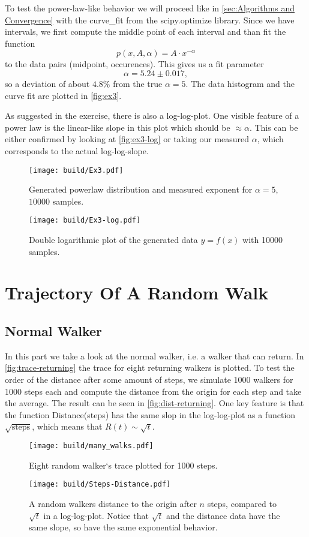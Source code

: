 \documentclass{article}
\begin{document}
To test the power-law-like behavior we will proceed like in \autoref{sec:Algorithms and Convergence} with 
the curve\_fit from the scipy.optimize library. Since we have intervals, we first compute the middle point
of each interval and than fit the function
\[
  p(x, A, \alpha) = A \cdot x^{-\alpha}
\]
to the data pairs (midpoint, occurences). This gives us a fit parameter 
\[
  \alpha = 5.24 \pm 0.017,
\]
so a deviation of about $4.8\%$ from the true $\alpha = 5$. The data histogram and the curve fit are plotted in 
\autoref{fig:ex3}.

As suggested in the exercise, there is also a log-log-plot. One visible feature of a power law is the linear-like
slope in this plot which should be $\approx \alpha$. This can be either confirmed by looking at 
\autoref{fig:ex3-log} or taking our measured $\alpha$, which corresponds to the actual log-log-slope.
\begin{figure}[H]
	\centering
	\texttt{[image: build/Ex3.pdf]}
	\caption{Generated powerlaw distribution and measured exponent for $\alpha = 5$, $10000$ samples.}
  \label{fig:ex3}
\end{figure}
\begin{figure}[H]
	\centering
	\texttt{[image: build/Ex3-log.pdf]}
	\caption{Double logarithmic plot of the generated data $y = f(x)$ with 10000 samples.}
  \label{fig:ex3-log}
\end{figure}



\section{Trajectory Of A Random Walk}
\label{sec:Trajectory Of A Random Walk}

\subsection{Normal Walker}
\label{sec:Normal Walker}
In this part we take a look at the normal walker, i.e. a walker that can return.
In \autoref{fig:trace-returning} the trace for eight returning walkers is plotted. 
To test the order of the distance after some amount of steps, we simulate 1000 walkers
for 1000 steps each and compute the distance from the origin for each step and take the average.
The result can be seen in \autoref{fig:dist-returning}. One key feature is that the function 
Distance(steps) has the same slop in the log-log-plot as a function $\sqrt{\text{steps}}$, which means that
$R(t) \sim \sqrt{t}$.
\begin{figure}[H]
	\centering
	\texttt{[image: build/many\_walks.pdf]}
	\caption{Eight random walker`s trace plotted for 1000 steps.}
  \label{fig:trace-returning}
\end{figure}
\begin{figure}[H]
	\centering
	\texttt{[image: build/Steps-Distance.pdf]}
  \caption{A random walkers distance to the origin after $n$ steps, compared to $\sqrt{t}$ in a log-log-plot. 
  Notice that $\sqrt{t}$ and the distance data have the same slope, so have the same exponential behavior.}
  \label{fig:dist-returning}
\end{figure}
\end{document}
